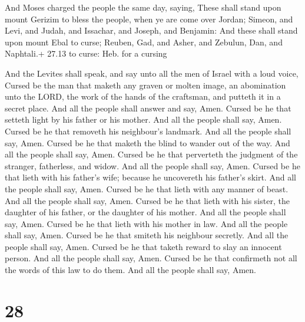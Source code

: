  And Moses charged the people the same day, saying,
 These shall stand upon mount Gerizim to bless the people,
when ye are come over Jordan; Simeon, and Levi, and Judah, and Issachar,
and Joseph, and Benjamin:  And these shall stand upon mount
Ebal to curse; Reuben, Gad, and Asher, and Zebulun, Dan, and Naphtali.+
27.13 to curse: Heb. for a cursing

 And the Levites shall speak, and say unto all the men of
Israel with a loud voice,  Cursed be the man that maketh
any graven or molten image, an abomination unto the LORD, the work of
the hands of the craftsman, and putteth it in a secret place. And all
the people shall answer and say, Amen.  Cursed be he that
setteth light by his father or his mother. And all the people shall say,
Amen.  Cursed be he that removeth his neighbour's landmark.
And all the people shall say, Amen.  Cursed be he that
maketh the blind to wander out of the way. And all the people shall say,
Amen.  Cursed be he that perverteth the judgment of the
stranger, fatherless, and widow. And all the people shall say, Amen.
 Cursed be he that lieth with his father's wife; because he
uncovereth his father's skirt. And all the people shall say, Amen.
 Cursed be he that lieth with any manner of beast. And all
the people shall say, Amen.  Cursed be he that lieth with
his sister, the daughter of his father, or the daughter of his mother.
And all the people shall say, Amen.  Cursed be he that
lieth with his mother in law. And all the people shall say, Amen.
 Cursed be he that smiteth his neighbour secretly. And all
the people shall say, Amen.  Cursed be he that taketh
reward to slay an innocent person. And all the people shall say, Amen.
 Cursed be he that confirmeth not all the words of this law
to do them. And all the people shall say, Amen.

\hypertarget{section-27}{%
\section{28}\label{section-27}}

